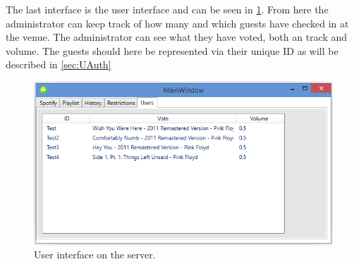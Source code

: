 The last interface is the user interface and can be seen in \cref{fig:ServerInterfaceUsers}. From here the administrator can keep track of how many and which guests have checked in at the venue. The administrator can see what they have voted, both an track and volume. The guests should here be represented via their unique ID as will be described in \cref{sec:UAuth}
\begin{figure}[hbtp]
  \centering
  \includegraphics[width=\textwidth]{Images/ServerInterfaceUsers.png}
  \caption{User interface on the server.}\label{fig:ServerInterfaceUsers}
\end{figure}
